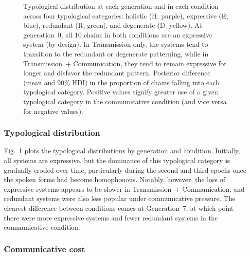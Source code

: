 \documentclass[doc,biblatex]{apa7}
\begin{document}
	\begin{figure}
	\vspace*{2pt}
	\caption{Typological distribution at each generation and in each condition across four typological categories: holistic (H; purple), expressive (E; blue), redundant (R, green), and degenerate (D; yellow). At generation~0, all 10 chains in both conditions use an expressive system (by design). In Transmission-only, the systems tend to transition to the redundant or degenerate patterning, while in Transmission~+ Communication, they tend to remain expressive for longer and disfavor the redundant pattern. Posterior difference (mean and 90\% HDI) in the proportion of chains falling into each typological category. Positive values signify greater use of a given typological category in the communicative condition (and vice versa for negative values).}
	\label{typ_dist_con}
	\end{figure}

\subsubsection{Typological distribution}

Fig.~\ref{typ_dist_con} plots the typological distributions by generation and condition. Initially, all systems are expressive, but the dominance of this typological category is gradually eroded over time, particularly during the second and third epochs once the spoken forms had become homophonous. Notably, however, the loss of expressive systems appears to be slower in Transmission~+ Communication, and redundant systems were also less popular under communicative pressure. The clearest difference between conditions comes at Generation~7, at which point there were more expressive systems and fewer redundant systems in the communicative condition.

\subsubsection{Communicative cost}
\end{document}
